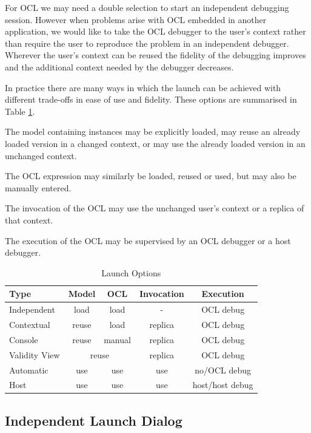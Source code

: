 \documentclass[a4paper]{article}
\begin{document}
For OCL we may need a double selection to start an independent debugging session. However when problems arise with OCL embedded in another application, we would like to take the OCL debugger to the user's context rather than require the user to reproduce the problem in an independent debugger. Wherever the user's context can be reused the fidelity of the debugging improves and the additional context needed by the debugger decreases.

In practice there are many ways in which the launch can be achieved with different trade-offs in ease of use and fidelity. These options are summarised in Table \ref{LaunchOptions}.

The model containing instances may be explicitly loaded, may reuse an already loaded version in a changed context, or may use the already loaded version in an unchanged context.

The OCL expression may similarly be loaded, reused or used, but may also be manually entered.

The invocation of the OCL may use the unchanged user's context or a replica of that context.

The execution of the OCL may be supervised by an OCL debugger or a host debugger.

\begin{table}[ht]
\begin{center}
\caption{Launch Options}\label{LaunchOptions}
\bigskip
\begin{tabular}{|l|c|c|c|c|}
\hline
Type & Model & OCL & Invocation & Execution\\ \hline \hline
Independent & load & load & - & OCL debug\\ \hline
Contextual & reuse & load & replica & OCL debug\\ \hline
Console & reuse & manual & replica & OCL debug\\ \hline
Validity View & \multicolumn{2}{|c|}{reuse} & replica & OCL debug\\ \hline
Automatic & use & use & use & no/OCL debug\\ \hline
Host & use & use & use & host/host debug\\ \hline
\end{tabular}
\end{center}
\end{table}
 
\subsection{Independent Launch Dialog}
\end{document}
